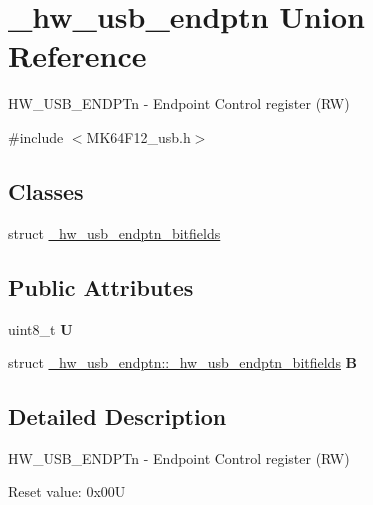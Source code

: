 \hypertarget{union__hw__usb__endptn}{}\section{\+\_\+hw\+\_\+usb\+\_\+endptn Union Reference}
\label{union__hw__usb__endptn}


H\+W\+\_\+\+U\+S\+B\+\_\+\+E\+N\+D\+P\+Tn -\/ Endpoint Control register (RW)  




{\ttfamily \#include $<$M\+K64\+F12\+\_\+usb.\+h$>$}

\subsection*{Classes}
\begin{DoxyCompactItemize}
\item 
struct \hyperlink{struct__hw__usb__endptn_1_1__hw__usb__endptn__bitfields}{\+\_\+hw\+\_\+usb\+\_\+endptn\+\_\+bitfields}
\end{DoxyCompactItemize}
\subsection*{Public Attributes}
\begin{DoxyCompactItemize}
\item 
uint8\+\_\+t {\bfseries U}\hypertarget{union__hw__usb__endptn_a2315f655a0f07c5bd35c0835e152dea8}{}\label{union__hw__usb__endptn_a2315f655a0f07c5bd35c0835e152dea8}

\item 
struct \hyperlink{struct__hw__usb__endptn_1_1__hw__usb__endptn__bitfields}{\+\_\+hw\+\_\+usb\+\_\+endptn\+::\+\_\+hw\+\_\+usb\+\_\+endptn\+\_\+bitfields} {\bfseries B}\hypertarget{union__hw__usb__endptn_a140fda31d862dda482c271b73baab89c}{}\label{union__hw__usb__endptn_a140fda31d862dda482c271b73baab89c}

\end{DoxyCompactItemize}


\subsection{Detailed Description}
H\+W\+\_\+\+U\+S\+B\+\_\+\+E\+N\+D\+P\+Tn -\/ Endpoint Control register (RW) 

Reset value\+: 0x00U

